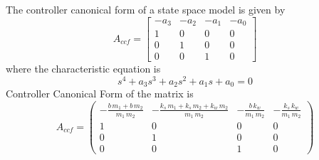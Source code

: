 \documentclass{article}
\newenvironment{answer}[2][Answer]{\begin{trivlist}
  \item[\hskip \labelsep {\bfseries #1}\hskip \labelsep {\bfseries #2:}]}{\end{trivlist}}
\begin{document}
\begin{answer}d
  The controller canonical form of a state space model is given by
  \[
    A_{ccf} =
    \begin{bmatrix}
      -a_3 & -a_2 & -a_1 & -a_0\\
      1 & 0 & 0 & 0\\
      0 & 1 & 0 & 0\\
      0 & 0 & 1 & 0
    \end{bmatrix}
  \]
  where the characteristic equation is
  $$s^4 + a_3s^3 + a_2 s^2 + a_1 s + a_0 = 0$$
  Controller Canonical Form of the matrix is
  $$A_{ccf} = \left(\begin{array}{cccc} -\frac{b\, m_{1} + b\, m_{2}}{m_{1}\, m_{2}} & -\frac{k_{s}\, m_{1} + k_{s}\, m_{2} + k_{w}\, m_{2}}{m_{1}\, m_{2}} & -\frac{b\, k_{w}}{m_{1}\, m_{2}} & -\frac{k_{s}\, k_{w}}{m_{1}\, m_{2}}\\ 1 & 0 & 0 & 0\\ 0 & 1 & 0 & 0\\ 0 & 0 & 1 & 0 \end{array}\right)$$
\end{answer}
\end{document}
